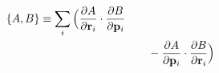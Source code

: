 \documentclass[preview]{standalone}
\begin{document}
\begin{align*}
\special{dvisvgm:raw <g id='unique000'>}\pb{A}{B}\equiv\sum_i\Big(\pdv{A}{\va r_i}\cdot\pdv{B}{\va p_i}\\&\qquad-\pdv{A}{\va p_i}\cdot\pdv{B}{\va r_i}\Big)\special{dvisvgm:raw </g>}
\end{align*}
\end{document}
